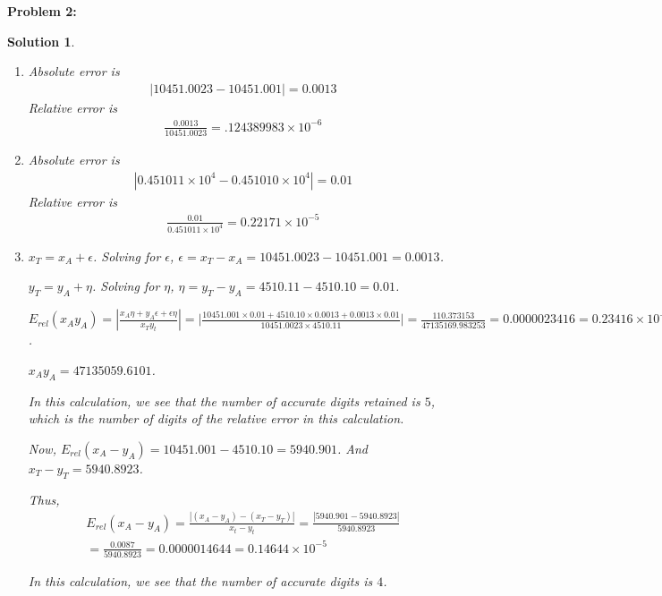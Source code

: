 \documentclass[12pt, letterpaper]{article}
\theoremstyle{nonumberplain}
\newtheorem{sol}{Solution}
\begin{document}
\hspace{18pt}\textbf{Problem 2:} \medskip
\begin{sol}
	\begin{enumerate}[label=\alph*)]
		\item Absolute error is
		      \begin{gather*}
			      |10451.0023 - 10451.001| = 0.0013
		      \end{gather*}
		      Relative error is
		      \begin{gather*}
			      \frac{0.0013}{10451.0023} = .124389983 \times 10^{-6}
		      \end{gather*}
		\item Absolute error is
		      \begin{gather*}
			      |0.451011 \times 10^4 - 0.451010\times 10^4| = 0.01
		      \end{gather*}
		      Relative error is
		      \begin{gather*}
			      \frac{0.01}{0.451011\times 10^4} = 0.22171 \times 10^{-5}
		      \end{gather*}
		\item $x_T = x_A + \epsilon$. Solving for $\epsilon$, $\epsilon = x_T - x_A = 10451.0023 - 10451.001 = 0.0013$.

		      $y_T = y_A + \eta$. Solving for $\eta$, $\eta = y_T - y_A = 4510.11 - 4510.10 = 0.01$.

		      $E_{rel}(x_Ay_A) = | \frac{x_A\eta + y_A\epsilon + \epsilon \eta}{x_Ty_t} | = \Big|  \frac{10451.001 \times 0.01 + 4510.10 \times 0.0013 + 0.0013 \times 0.01}{10451.0023 \times 4510.11} | = \frac{110.373153}{47135169.983253} = 0.0000023416 = 0.23416\times 10^{-5}$.

		      $x_Ay_A = 47135059.6101$.

		      In this calculation, we see that the number of accurate digits retained is $5$, which is the number of digits of the relative error in this calculation.

		      Now, $E_{rel}(x_A - y_A) = 10451.001 - 4510.10 = 5940.901$. And $x_T - y_T = 5940.8923$.

		      Thus,
		      \begin{gather*}
			      E_{rel}(x_A - y_A) = \frac{|(x_A - y_A) - (x_T - y_T)|}{x_t - y_t}  = \frac{|5940.901 - 5940.8923|}{5940.8923} \\
			      = \frac{0.0087}{5940.8923} = 0.0000014644 = 0.14644 \times 10^{-5}
		      \end{gather*}

		      In this calculation, we see that the number of accurate digits is $4$.
	\end{enumerate}
\end{sol}
\end{document}
